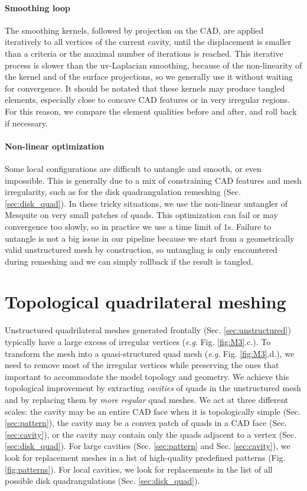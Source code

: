 \documentclass[AMA,STIX1COL]{WileyNJD-v2}
\newcommand{\eg}{\textit{e}.\textit{g}. }
\newcommand\rsec[1]{Sec. \ref{#1}}
\newcommand\rfig[1]{Fig. \ref{#1}}
\begin{document}
{\paragraph{Smoothing loop}
The smoothing kernels, followed by projection on the CAD,
are applied iteratively to all vertices of
the current cavity, until the displacement is smaller than a criteria or the
maximal number of iterations is reached. This iterative process is slower than
the uv-Laplacian smoothing, because of the non-linearity of the kernel
and of the surface projections, so we generally use it without waiting for
convergence. It should be notated that these kernels may produce tangled
elements, especially close to concave CAD features or in very irregular
regions. For this reason, we compare the element qualities before and after,
and roll back if necessary.

\paragraph{Non-linear optimization} Some local configurations
are difficult to untangle and smooth, or even impossible. This is generally due to a mix of constraining
CAD features and mesh irregularity, such as for the disk quadrangulation remeshing
(\rsec{sec:disk_quad}). In these tricky situations, we use the non-linear 
untangler of Mesquite \cite{mesquite} on very small patches of quads. This
optimization can fail or may convergence too slowly, so in practice we use
a time limit of $1$s. Failure to untangle is not a big issue in our
pipeline because we start from a geometrically valid unstructured mesh by
construction, so untangling is only encountered during remeshing and we
can simply rollback if the result is tangled.

\section{Topological quadrilateral meshing}
\label{sec:topological_quad}

Unstructured quadrilateral meshes generated frontally (\rsec{sec:unstructured})
typically have a large excess of irregular vertices (\eg \rfig{fig:M3}.c.). 
To transform the mesh into a quasi-structured quad mesh (\eg \rfig{fig:M3}.d.), 
we need to remove most of the irregular vertices while preserving the ones that important
to accommodate the model topology and geometry. We achieve this topological
improvement by extracting \emph{cavities} of quads in the unstructured mesh and by
replacing them by \emph{more regular} quad meshes.
We act at three different
scales: the cavity may be an entire CAD face when it is topologically simple
(\rsec{sec:pattern}), the cavity may be a convex patch of quads in a CAD face
(\rsec{sec:cavity}), or the cavity may contain only the quads adjacent to
a vertex (\rsec{sec:disk_quad}). For large cavities
(\rsec{sec:pattern} and \rsec{sec:cavity}), we look
for replacement meshes in a list of high-quality predefined patterns (\rfig{fig:patterns}).
For local cavities, we look for replacements in the list
of all possible disk quadrangulations (\rsec{sec:disk_quad}).

}
\end{document}
